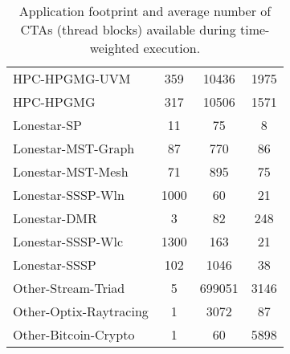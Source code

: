 \begin{table}[t]
\begin{small}
\begin{tabular}{lccc}
HPC-HPGMG-UVM & 359 & 10436 & 1975 \\
HPC-HPGMG & 317 & 10506 & 1571 \\
Lonestar-SP & 11 & 75 & 8 \\
Lonestar-MST-Graph & 87 & 770 & 86 \\
Lonestar-MST-Mesh & 71 & 895 & 75 \\
Lonestar-SSSP-Wln & 1000 & 60 & 21 \\
Lonestar-DMR & 3 & 82 & 248 \\
Lonestar-SSSP-Wlc & 1300 & 163 & 21 \\
Lonestar-SSSP & 102 & 1046 & 38 \\
Other-Stream-Triad & 5 & 699051 & 3146 \\
Other-Optix-Raytracing & 1 & 3072 & 87 \\
Other-Bitcoin-Crypto & 1 & 60 & 5898 \\
\toprule
\end{tabular}
\caption{Application footprint and average number of CTAs (thread blocks) 
available during time-weighted execution.}
\label{tab:numctas}
\end{small}
\end{table}
